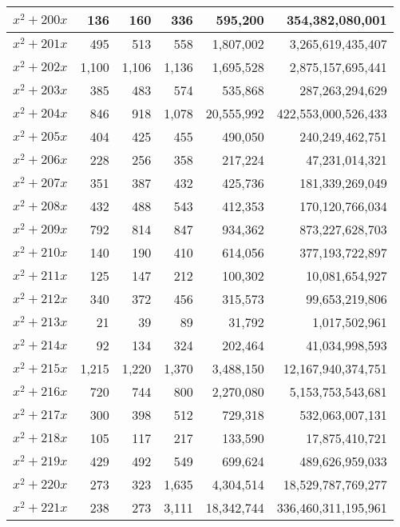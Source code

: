 \documentclass[a4paper]{amsproc}
\theoremstyle{plain}
\begin{document}
\begin{longtable}{ | l | r | r | r | r | r | }
$x^2 + 200x$ & 136 & 160 & 336 & 595{,}200 & 354{,}382{,}080{,}001 \\ \hline
$x^2 + 201x$ & 495 & 513 & 558 & 1{,}807{,}002 & 3{,}265{,}619{,}435{,}407 \\ \hline
$x^2 + 202x$ & 1{,}100 & 1{,}106 & 1{,}136 & 1{,}695{,}528 & 2{,}875{,}157{,}695{,}441 \\ \hline
$x^2 + 203x$ & 385 & 483 & 574 & 535{,}868 & 287{,}263{,}294{,}629 \\ \hline
$x^2 + 204x$ & 846 & 918 & 1{,}078 & 20{,}555{,}992 & 422{,}553{,}000{,}526{,}433 \\ \hline
$x^2 + 205x$ & 404 & 425 & 455 & 490{,}050 & 240{,}249{,}462{,}751 \\ \hline
$x^2 + 206x$ & 228 & 256 & 358 & 217{,}224 & 47{,}231{,}014{,}321 \\ \hline
$x^2 + 207x$ & 351 & 387 & 432 & 425{,}736 & 181{,}339{,}269{,}049 \\ \hline
$x^2 + 208x$ & 432 & 488 & 543 & 412{,}353 & 170{,}120{,}766{,}034 \\ \hline
$x^2 + 209x$ & 792 & 814 & 847 & 934{,}362 & 873{,}227{,}628{,}703 \\ \hline
$x^2 + 210x$ & 140 & 190 & 410 & 614{,}056 & 377{,}193{,}722{,}897 \\ \hline
$x^2 + 211x$ & 125 & 147 & 212 & 100{,}302 & 10{,}081{,}654{,}927 \\ \hline
$x^2 + 212x$ & 340 & 372 & 456 & 315{,}573 & 99{,}653{,}219{,}806 \\ \hline
$x^2 + 213x$ & 21 & 39 & 89 & 31{,}792 & 1{,}017{,}502{,}961 \\ \hline
$x^2 + 214x$ & 92 & 134 & 324 & 202{,}464 & 41{,}034{,}998{,}593 \\ \hline
$x^2 + 215x$ & 1{,}215 & 1{,}220 & 1{,}370 & 3{,}488{,}150 & 12{,}167{,}940{,}374{,}751 \\ \hline
$x^2 + 216x$ & 720 & 744 & 800 & 2{,}270{,}080 & 5{,}153{,}753{,}543{,}681 \\ \hline
$x^2 + 217x$ & 300 & 398 & 512 & 729{,}318 & 532{,}063{,}007{,}131 \\ \hline
$x^2 + 218x$ & 105 & 117 & 217 & 133{,}590 & 17{,}875{,}410{,}721 \\ \hline
$x^2 + 219x$ & 429 & 492 & 549 & 699{,}624 & 489{,}626{,}959{,}033 \\ \hline
$x^2 + 220x$ & 273 & 323 & 1{,}635 & 4{,}304{,}514 & 18{,}529{,}787{,}769{,}277 \\ \hline
$x^2 + 221x$ & 238 & 273 & 3{,}111 & 18{,}342{,}744 & 336{,}460{,}311{,}195{,}961 \\ \hline

\end{longtable}
\end{document}
